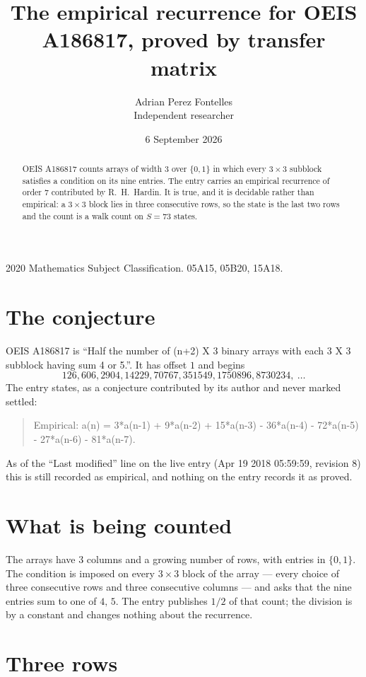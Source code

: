 \documentclass[11pt,a4paper]{article}
\title{The empirical recurrence for OEIS A186817, proved by transfer matrix}
\author{Adrian Perez Fontelles\\ \small Independent researcher}
\date{6 September 2026}
\theoremstyle{plain}
\theoremstyle{definition}
\begin{document}
\maketitle

\begin{abstract}
OEIS A186817 counts arrays of width $3$ over $\{0,1\}$ in which every $3\times3$ subblock
satisfies a condition on its nine entries. The entry carries an empirical recurrence of order
$7$ contributed by R.~H.~Hardin. It is true, and it is decidable rather than empirical: a
$3\times3$ block lies in three consecutive rows, so the state is the last two rows and the
count is a walk count on $S=73$ states.
\end{abstract}

\noindent\small 2020 Mathematics Subject Classification. 05A15, 05B20, 15A18.\normalsize

\section{The conjecture}

OEIS A186817 is ``Half the number of (n+2) X 3 binary arrays with each 3 X 3 subblock having sum 4 or 5.''. It has offset $1$ and begins
\[
126, 606, 2904, 14229, 70767, 351549, 1750896, 8730234,\ \dots
\]
The entry states, as a conjecture contributed by its author and never marked settled:
\begin{quote}
Empirical: a(n) = 3*a(n-1) + 9*a(n-2) + 15*a(n-3) - 36*a(n-4) - 72*a(n-5) - 27*a(n-6) - 81*a(n-7).
\end{quote}
As of the ``Last modified'' line on the live entry (Apr 19 2018 05:59:59, revision 8) this is still
recorded as empirical, and nothing on the entry records it as proved.

\section{What is being counted}

The arrays have $3$ columns and a growing number of rows, with entries in $\{0,1\}$. The
condition is imposed on every $3\times3$ block of the array --- every choice of three
consecutive rows and three consecutive columns --- and asks that the nine entries sum to one of $4,\,5$. The entry publishes $1/2$ of that count; the division is by a constant and changes nothing about the recurrence.



\section{Three rows}
\end{document}
